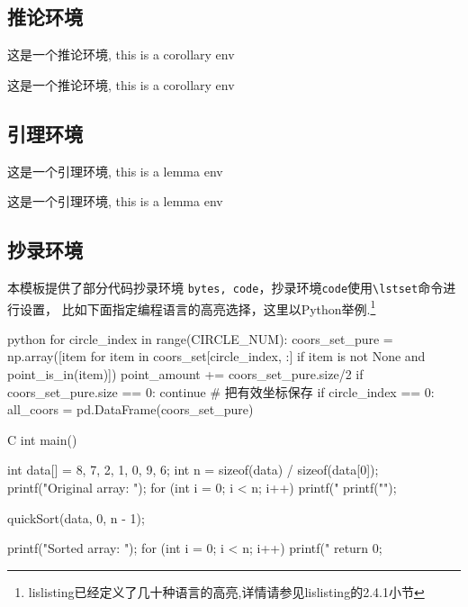 \documentclass[lang=cn, math=mathptmx]{ZLaTeX}
\begin{document}

\subsection{推论环境}
\begin{bytes}[10]
\begin{corollary}[某推论]
    这是一个推论环境, this is a corollary env
\end{corollary}
\end{bytes}
\begin{corollary}[某推论]
    这是一个推论环境, this is a corollary env
\end{corollary}

\subsection{引理环境}
\begin{bytes}[10]
\begin{lemma}[某引理]
    这是一个引理环境, this is a lemma env
\end{lemma}
\end{bytes}
\begin{lemma}[某引理]
    这是一个引理环境, this is a lemma env
\end{lemma}





\clearpage
\subsection{抄录环境}
本模板提供了部分代码抄录环境 \verb|bytes, code|，抄录环境\verb|code|使用\verb|\lstset|命令进行设置，
比如下面指定编程语言的高亮选择，这里以Python举例.\footnote[2]{lislisting已经定义了几十种语言的高亮,详情请参见lislisting的2.4.1小节}

\begin{code}{python}
for circle_index in range(CIRCLE_NUM):
    coors_set_pure = np.array([item for item in coors_set[circle_index, :] if item is not None and point_is_in(item)])
    point_amount += coors_set_pure.size/2
    if coors_set_pure.size == 0:
        continue
    # 把有效坐标保存
    if circle_index == 0:
        all_coors = pd.DataFrame(coors_set_pure)
\end{code}

\begin{code}{C}
int main() {
    int data[] = {8, 7, 2, 1, 0, 9, 6};
    int n = sizeof(data) / sizeof(data[0]);
    printf("Original array: \n");
    for (int i = 0; i < n; i++) {
        printf("%
    }
    printf("\n");
    
    quickSort(data, 0, n - 1);
    
    printf("Sorted array: \n");
    for (int i = 0; i < n; i++) {
        printf("%
    }
    return 0;
}    
\end{code}
\end{document}

